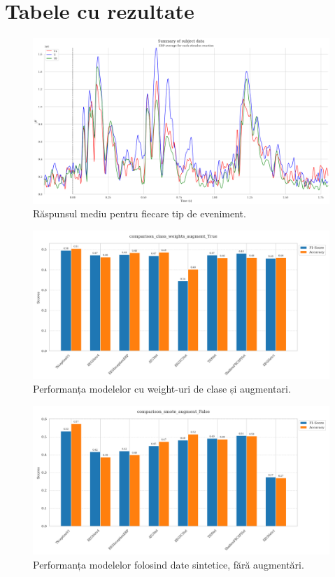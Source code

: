 \chapter{Tabele cu rezultate}

\begin{figure}
    \centering
    \includegraphics[width=1\linewidth]{images/average_response_each_erp.png}
    \caption{Răspunsul mediu pentru fiecare tip de eveniment.}
    \label{fig:average_response_by_event}
\end{figure}

\begin{figure}[h]
    \centering
    \includegraphics[width=1\linewidth]{images/comparison_class_weights_augment_True.png}
    \caption{Performanța modelelor cu weight-uri de clase și augmentari.}
    \label{fig:performance_class_weights_augment_true}
\end{figure}

\begin{figure}
    \centering
    \includegraphics[width=1\linewidth]{images/comparison_smote_augment_False.png}
    \caption{Performanța modelelor folosind date sintetice, fără augmentări.}
    \label{fig:smote_augment_false}
\end{figure}

